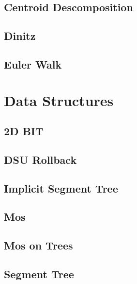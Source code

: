 \subsection{   Centroid Descomposition}
\raggedbottom
\hrulefill
\subsection{   Dinitz}
\raggedbottom
\hrulefill
\subsection{   Euler Walk}
\raggedbottom
\hrulefill

\section{Data Structures}
\subsection{   2D BIT}
\raggedbottom
\hrulefill
\subsection{   DSU Rollback}
\raggedbottom
\hrulefill
\subsection{   Implicit Segment Tree}
\raggedbottom
\hrulefill
\subsection{   Mos}
\raggedbottom
\hrulefill
\subsection{   Mos on Trees}
\raggedbottom
\hrulefill
\subsection{   Segment Tree}
\raggedbottom
\hrulefill
